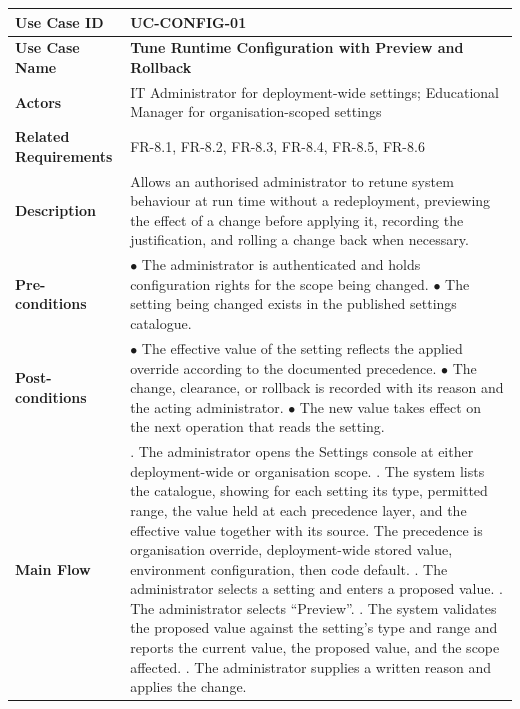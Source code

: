 \begin{longtable}{|>{\raggedright\arraybackslash}p{}|>{\raggedright\arraybackslash}p{}|}
\textbf{Use Case ID} & \textbf{UC-CONFIG-01} \\ \hline
\textbf{Use Case Name} & \textbf{Tune Runtime Configuration with Preview and Rollback} \\ \hline
\textbf{Actors} & IT Administrator for deployment-wide settings; Educational Manager for organisation-scoped settings \\ \hline
\textbf{Related Requirements} & FR-8.1, FR-8.2, FR-8.3, FR-8.4, FR-8.5, FR-8.6 \\ \hline
\textbf{Description} & Allows an authorised administrator to retune system behaviour at run time without a redeployment, previewing the effect of a change before applying it, recording the justification, and rolling a change back when necessary. \\ \hline
\textbf{Pre-conditions} &
$\bullet$ The administrator is authenticated and holds configuration rights for the scope being changed. \newline
$\bullet$ The setting being changed exists in the published settings catalogue. \\ \hline
\textbf{Post-conditions} &
$\bullet$ The effective value of the setting reflects the applied override according to the documented precedence. \newline
$\bullet$ The change, clearance, or rollback is recorded with its reason and the acting administrator. \newline
$\bullet$ The new value takes effect on the next operation that reads the setting. \\ \hline
\textbf{Main Flow} &
1. The administrator opens the Settings console at either deployment-wide or organisation scope. \newline
2. The system lists the catalogue, showing for each setting its type, permitted range, the value held at each precedence layer, and the effective value together with its source. The precedence is organisation override, deployment-wide stored value, environment configuration, then code default. \newline
3. The administrator selects a setting and enters a proposed value. \newline
4. The administrator selects ``Preview''. \newline
5. The system validates the proposed value against the setting's type and range and reports the current value, the proposed value, and the scope affected. \newline
6. The administrator supplies a written reason and applies the change. \newline

\end{longtable}
